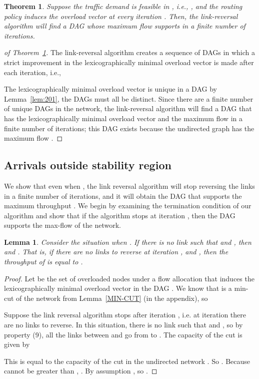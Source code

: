 \documentclass{sig-alternate-2013}
\newtheorem{lemma}{Lemma}
\newtheorem{theorem}{Theorem}
\begin{document}
\begin{theorem} \label{thm: main}
Suppose the traffic demand is feasible in , i.e., , and the routing policy induces the overload vector  at every iteration . Then, the link-reversal algorithm will find a DAG whose maximum flow supports  in a finite number of iterations.
\end{theorem}
\begin{proof}[of Theorem~\ref{thm: main}]
The link-reversal algorithm creates a sequence of DAGs  in which a strict improvement in the lexicographically minimal overload vector is made after each iteration, i.e.,

The lexicographically minimal overload vector is unique in a DAG by Lemma~\ref{lem:201}, the DAGs  must all be distinct. Since there are a finite number of unique DAGs in the network, the link-reversal algorithm will find a DAG  that has the lexicographically minimal overload vector  and the maximum flow  in a finite number of iterations; this DAG  exists because the undirected graph  has the maximum flow .
\end{proof}

\subsection{Arrivals outside stability region}
We show that even when , the link reversal algorithm will stop reversing the links in a finite number of iterations, and it will obtain the DAG that supports the maximum throughput . We begin by examining the termination condition of our algorithm and show that if the algorithm stops at iteration , then the DAG  supports the max-flow of the network. 

\begin{lemma}
Consider the situation when . If there  is no link  such that  and , then  and . That is, if there are no links to reverse at iteration , and , then the throughput of  is equal to .
\end{lemma}
\begin{proof}
Let  be the set of overloaded nodes under a flow allocation that induces the lexicographically minimal overload vector  in the DAG . We know that  is a min-cut of the network from Lemma~\ref{MIN-CUT} (in the appendix), so 

Suppose the link reversal algorithm stops after iteration , i.e. at iteration  there are no links to reverse. In this situation, there  is no link  such that  and , so by property (9), all the links between  and  go from  to . The capacity of the cut  is given by 

This is equal to the capacity of the cut  in the undirected network . So . Because  cannot be greater than , . By assumption , so .
\end{proof}
\end{document}
